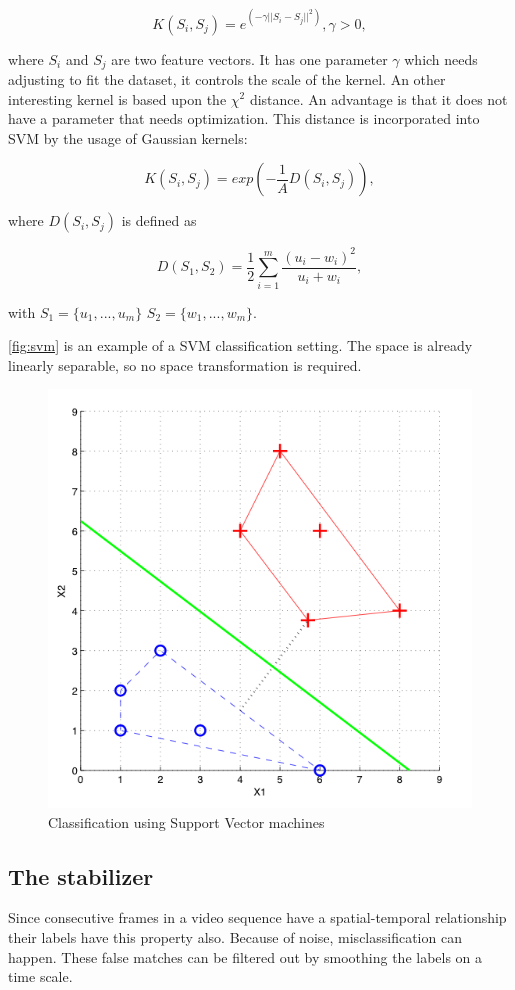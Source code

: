 \begin{equation}
	K(S_i,S_j) = e^{(-\gamma||S_i-S_j||^2)}, \gamma > 0,
\end{equation}

where $S_i$ and $S_j$ are two feature vectors. It has one parameter $\gamma$ which needs adjusting to fit the dataset, it controls the scale of the kernel. An other interesting kernel is based upon the $\chi^2$ distance\citep{Zhang2007}. An advantage is that it does not have a parameter that needs optimization. This distance is incorporated into SVM by the usage of Gaussian kernels\citep{Chapelle1999}:

\begin{equation}
	K(S_i,S_j) = exp(-\frac{1}{A}D(S_i,S_j)),
\end{equation}

where $D(S_i,S_j)$ is defined as

\begin{equation}
	D(S_1,S_2) = \frac{1}{2}\sum^{m}_{i=1}\frac{(u_i-w_i)^2}{u_i+w_i},
\end{equation}

with $S_1 = \{u_1, ... , u_m\}$ $S_2 = \{w_1, ... , w_m\}$.

\autoref{fig:svm} is an example of a SVM classification setting. The space is already linearly separable, so no space transformation is required. 

\begin{figure}[tb]
\center{}
\includegraphics[width=0.5\linewidth]{figures/svm2.png}
\caption{Classification using Support Vector machines}
\label{fig:svm}
\end{figure}




\subsection*{The stabilizer}
\label{subsec:stabilizer}
Since consecutive frames in a video sequence have a spatial-temporal relationship their labels have this property also. Because of noise, misclassification can happen. These false matches can be filtered out by smoothing the labels on a time scale.

